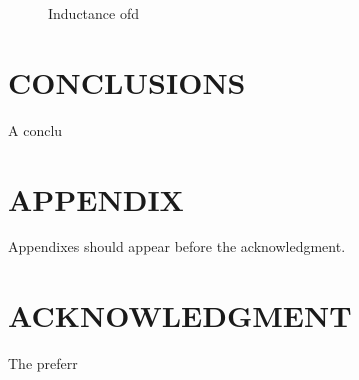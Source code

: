 \documentclass[letterpaper, 10 pt, conference]{ieeeconf}  %
\begin{document}
   \begin{figure}[thpb]
      \centering
      \caption{Inductance ofd}
      \label{figurelabel}
   \end{figure}




\section{CONCLUSIONS}

A conclu

\addtolength{\textheight}{-12cm}   %







\section*{APPENDIX}

Appendixes should appear before the acknowledgment.

\section*{ACKNOWLEDGMENT}

The preferr






\end{document}
